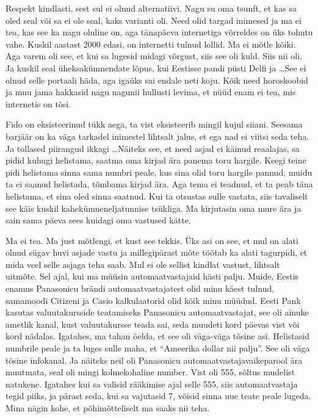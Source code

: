 
Respekt kindlasti, sest sul ei olnud alternatiivi. Nagu su oma tsunft, et kas sa oled seal või sa ei ole seal, kaks varianti oli. Need olid targad inimesed ja ma ei tea, kas see  ka nagu oluline on, aga tänapäeva internetiga võrreldes on üks tohutu vahe. Kuskil aastast 2000 edasi, on internetti tulnud lollid. Ma ei mõtle kõiki. Aga varem oli see, et kui sa lugesid midagi võrgust, siis see oli kuld. Siis nii oli. Ja kuskil seal üheksakümnendate lõpus, kui Eestisse pandi püsti Delfi ja \ldots See ei olnud  selle portaali häda, aga igaüks sai endale neti koju. Kõik need horoskoobid ja muu jama hakkasid nagu nagunii hullusti levima, et nüüd enam ei tea, mis internetis on tõsi. 


Fido on eksisteerinud  tükk aega, ta vist eksisteerib mingil kujul siiani. Seesama barjäär on ka väga tarkadel inimestel lihtsalt jalus, et ega nad ei viitsi seda teha. Ja tollased piirangud ikkagi \ldots Näiteks see, et need asjad ei käinud reaalajas, sa pidid kuhugi helistama, saatma oma kirjad ära panema toru hargile. Keegi teine pidi helistama sinna sama numbri peale, kus sina olid toru hargile pannud, muidu ta ei saanud helistada, tõmbama kirjad ära. Aga tema ei teadnud, et ta peab täna helistama, et sina oled sinna saatnud. Kui ta otsustas sulle vastata, siis tavaliselt see käis kuskil kahekümneneljatunnise tsükliga. Ma kirjutasin oma mure ära ja sain sama päeva sees kuidagi oma vastused kätte. 


Ma ei tea. Ma just mõtlengi, et kust see tekkis. Üks asi on see, et mul on alati olnud sügav huvi asjade vastu ja millegipärast mõte töötab ka alati tagurpidi, et mida veel selle asjaga teha saab. Mul ei ole sellist kindlat vastust, lihtsalt uitmõte. Sel ajal, kui ma müüsin automaatvastajaid hästi palju. Muide, Eestis enamus Panasonicu brändi automaatvastajatest olid minu käest tulnud, samamoodi Citizeni ja Casio kalkulaatorid olid kõik minu müüdud. Eesti Pank kasutas valuutakursside teatamiseks Panasonicu automaatvastajat, see oli ainuke ametlik kanal, kust valuutakursse teada sai, seda muudeti kord päevas vist või kord nädalas. Igatahes, ma tahan öelda, et see oli väga-väga tõsine asi. Helistasid numbrile peale ja ta luges sulle maha, et \enquote{Ameerika dollar nii palju}. See oli väga tõsine infokanal. Ja näiteks neil oli Panasonicu automaatvastajavaikeparool ära muutmata, seal oli mingi kolmekohaline number. Vist oli 555, sõltus mudelist natukene. Igatahes kui sa valisid rääkimise ajal selle 555, siis  automaatvastaja tegid piiks, ja pärast seda, kui sa vajutasid 7, võisid sinna uue teate peale lugeda. Mina nägin kohe, et põhimõtteliselt ma saaks nii teha. 

